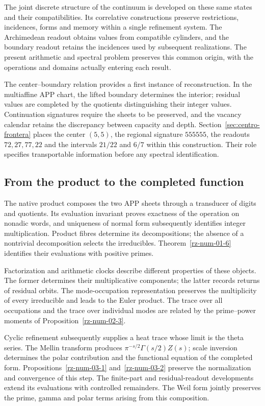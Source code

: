 The joint discrete structure of the continuum is developed
on these same states and their compatibilities. Its
correlative constructions preserve restrictions, incidences,
forms and memory within a single refinement system.
The Archimedean readout obtains values from compatible
cylinders, and the boundary readout retains the incidences
used by subsequent realizations. The present arithmetic
and spectral problem preserves this common origin, with
the operations and domains actually entering each result.

The center--boundary relation provides a first instance of
reconstruction. In the multiaffine APP chart, the lifted
boundary determines the interior; residual values are
completed by the quotients distinguishing their integer
values. Continuation signatures require the sheets to be
preserved, and the vacancy calendar retains the discrepancy
between capacity and depth. Section~\ref{sec:centro-frontera}
places the center $(5,5)$, the regional signature $555555$,
the readouts $72,27,77,22$ and the intervals $21/22$ and
$6/7$ within this construction. Their role specifies
transportable information before any spectral identification.

\subsection*{From the product to the completed function}

The native product composes the two APP sheets through a
transducer of digits and quotients. Its evaluation invariant
proves exactness of the operation on nonadic words, and
uniqueness of normal form subsequently identifies integer
multiplication. Product fibres determine its decompositions;
the absence of a nontrivial decomposition selects the
irreducibles. Theorem~\ref{rz-num-01-6} identifies their
evaluations with positive primes.

Factorization and arithmetic clocks describe different
properties of these objects. The former determines their
multiplicative components; the latter records returns of
residual orbits. The mode-occupation representation preserves
the multiplicity of every irreducible and leads to the
Euler product. The trace over all occupations and the
trace over individual modes are related by the prime--power
moments of Proposition~\ref{rz-num-02-3}.

Cyclic refinement subsequently supplies a heat trace whose
limit is the theta series. The Mellin transform produces
$\pi^{-s/2}\Gamma(s/2)Z(s)$; scale inversion determines
the polar contribution and the functional equation of the
completed form. Propositions~\ref{rz-num-03-1}
and~\ref{rz-num-03-2} preserve the normalization and
convergence of this step. The finite-part and residual-readout
developments extend its evaluations with controlled
remainders. The Weil form jointly preserves the prime,
gamma and polar terms arising from this composition.

